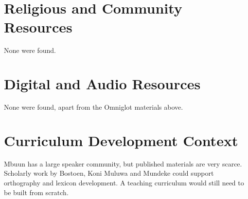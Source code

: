 \documentclass[12pt]{article}
\begin{document}
\section{Religious and Community Resources}
None were found.

\section{Digital and Audio Resources}
None were found, apart from the Omniglot materials above.

\section{Curriculum Development Context}
Mbuun has a large speaker community, but published materials are very scarce. Scholarly work by Bostoen, Koni Muluwa and Mundeke could support orthography and lexicon development. A teaching curriculum would still need to be built from scratch.
\end{document}
